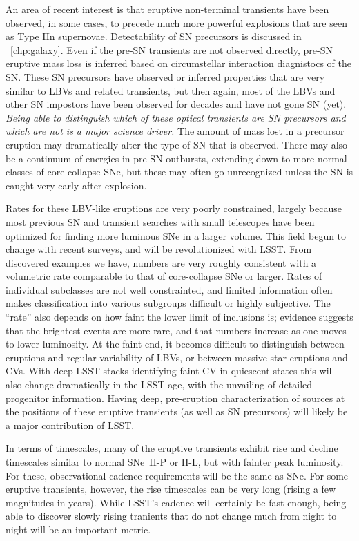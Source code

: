 An area of recent interest
is that eruptive non-terminal transients have been observed, in some
cases, to precede much more powerful explosions that are seen as Type
IIn supernovae.  Detectability of SN precursors is discussed in ~\autoref{chp:galaxy}. Even if the pre-SN transients are not observed
directly, pre-SN eruptive mass loss is inferred based on circumstellar
interaction diagnistocs of the SN.  These SN precursors have observed
or inferred properties that are very similar to LBVs and related
transients, 
but then again,
most of the LBVs and other SN impostors have been observed for decades
and have not gone SN (yet).  \emph{Being able to distinguish which of these
optical transients are SN precursors and which are not is a major
science driver.}  The amount of mass lost in a precursor eruption may
dramatically alter the type of SN that is observed.  There may also be
a continuum of energies in pre-SN outbursts, extending down to more
normal classes of core-collapse SNe, but these may often go
unrecognized unless the SN is caught very early after explosion.

Rates for these LBV-like eruptions are very poorly constrained,
largely because most previous SN and transient searches with small
telescopes have been optimized for finding more luminous SNe in a
larger volume.  This field begun to change with recent surveys, and will
be revolutionized with LSST.  From discovered examples we have,
numbers are very roughly consistent with a volumetric rate comparable
to that of core-collapse SNe or larger.  %
Rates of individual subclasses are not well constrainted, and limited
information often makes classification into various subgroups
difficult or highly subjective.  The ``rate'' also depends on how
faint the lower limit of inclusions is; evidence suggests that the
brightest events are more rare, and that numbers increase as one moves
to lower luminosity.  At the faint end, it becomes difficult to
distinguish between eruptions and regular variability of LBVs, or
between massive star eruptions and CVs. With deep LSST stacks identifying faint CV in quiescent states this will also change dramatically in the LSST age, with the unvailing of detailed progenitor
information.  Having deep, pre-eruption characterization
of sources at the positions of these eruptive transients (as well as
SN precursors) will likely be a major contribution of LSST.

In terms of timescales, many of the eruptive transients exhibit rise
and decline timescales similar to normal SNe~II-P or II-L, but with
fainter peak luminosity.  For these, observational cadence
requirements will be the same as SNe.  For some eruptive transients,
however, the rise timescales can be very long (rising a few magnitudes
in years).  While LSST's cadence will certainly be fast enough, being
able to discover slowly rising tranients that do not change much from
night to night will be an important metric.

